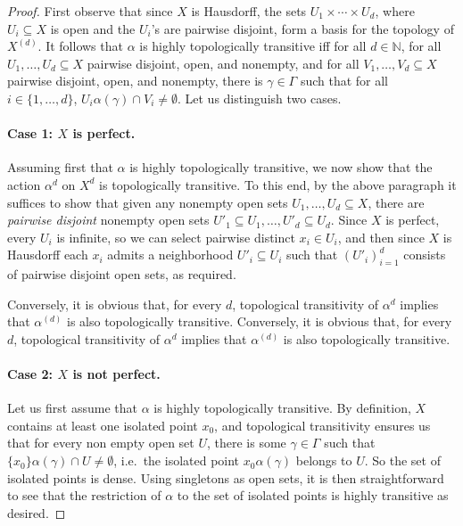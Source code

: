 \documentclass[12pt]{article}
\numberwithin{equation}{section}
\theoremstyle{definition}
\newcommand{\N}{\mathbb{N}}
\begin{document}
\begin{proof}
	First observe that since \(X\) is Hausdorff, 
	the sets \(U_1\times\cdots\times U_d \),
	where \(U_i\subseteq X\) is open and the \(U_i\)'s are pairwise disjoint,
	form a basis for the topology of \(X^{(d)}\).
	It follows that \( \alpha \) is highly topologically transitive
	iff for all \( d\in\N \), for all \(U_1,\dots,U_d\subseteq X\) pairwise disjoint, open, and nonempty,
	and for all \(V_1,\dots,V_d\subseteq X\) pairwise disjoint, open, and nonempty,
	there is \( \gamma\in\Gamma \) such that for all \( i\in \{1,\dots,d\} \), 
	\( U_i\alpha(\gamma)\cap V_i\neq \emptyset \).
	Let us distinguish two cases.

	\paragraph{Case 1: \( X \) is perfect.}
	Assuming first that \( \alpha \) is highly topologically transitive,
	we now show that the action \(\alpha^d\) on \(X^d\) is topologically transitive. 
	To this end, by the above paragraph
	it suffices to show that given any nonempty open sets \(U_1,\dots,U_d\subseteq X\),
	there are \emph{pairwise disjoint} nonempty open sets \(U'_1\subseteq U_1,\dots,U'_d\subseteq U_d\). 
	Since \(X\) is perfect, every \(U_i\) is infinite, so we can select pairwise distinct
	\( x_i\in U_i\), and then since \(X\) is Hausdorff each \(x_i\) admits a neighborhood
	\(U'_i\subseteq U_i\) such that \({(U'_i)}_{i=1}^d\) consists of pairwise disjoint open sets, as 
	required. 

	Conversely, it is obvious that, for every \( d \), topological transitivity of 
	\( \alpha^d \) implies that \(\alpha^{(d)}\) is also topologically transitive.
	Conversely, it is obvious that, for every \( d \), topological transitivity of 
	\( \alpha^d \) implies that \(\alpha^{(d)}\) is also topologically transitive.

	
	\paragraph{Case 2: \( X \) is not perfect.}
	Let us first assume that \( \alpha \) is highly topologically transitive. By definition, \(X\) contains at least one isolated 
	point \(x_0\), and topological transitivity ensures us that for every non empty open set \(U\),
	there is some \( \gamma\in\Gamma \) such that \( \{ x_0 \}\alpha(\gamma)\cap U\neq\emptyset \), 
	i.e.\ the isolated point \(x_0\alpha(\gamma)\) belongs to \(U\). 
	So the set of isolated points is dense. 
	Using singletons as open sets, it is then straightforward to see that the restriction of \( \alpha \) 
	to the set of isolated points is highly transitive as desired.


\end{proof}
\end{document}
